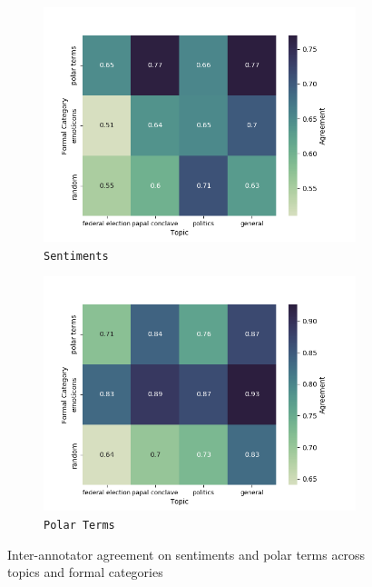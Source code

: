\begin{figure}[htbp!]
{
\centering
\begin{subfigure}{.5\textwidth}
  \centering
  \includegraphics[width=\linewidth]{img/sentiment_agreement.png}
  \caption{\texttt{Sentiments}}
\end{subfigure}%
\begin{subfigure}{.5\textwidth}
  \centering
  \includegraphics[width=\linewidth]{img/emo-expression_agreement.png}
  \caption{\texttt{Polar Terms}}
\end{subfigure}
}
\caption{Inter-annotator agreement on sentiments and polar terms
  across topics and formal categories}\label{snt:fig:crp-sent-emo-agr}
\end{figure}

